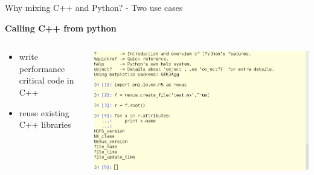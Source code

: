 
\frame{\partpage }
\begin{frame}[fragile]{Why mixing C++ and Python? - Two use cases}
    \begin{center}
        \textbf{Calling C++ from python}
    \end{center}
    \begin{columns}[c]
        \begin{column}{0.49\linewidth}
            \begin{itemize}
                \item write performance critical code in C++
                \item reuse existing C++ libraries 
            \end{itemize}
        \end{column}
        \hfill
        \begin{column}{0.4\linewidth}
            \includegraphics[width=\linewidth]{pics/ipython_screenshot.png}
        \end{column}
    \end{columns}
    

\end{frame}
